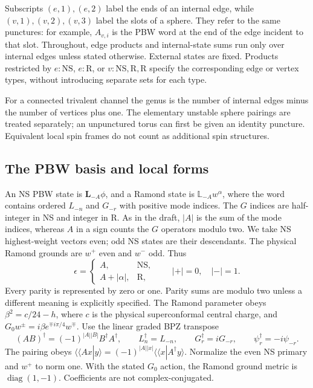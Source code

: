 \documentclass[11pt]{article}
\newcommand{\NS}{\mathrm{NS}}
\newcommand{\R}{\mathrm R}
\numberwithin{equation}{section}
\begin{document}
Subscripts $(e,1),(e,2)$ label the ends of an internal edge, while
$(v,1),(v,2),(v,3)$ label the slots of a sphere. They refer to the same
punctures: for example, $A_{v,i}$ is the PBW word at the end of the edge
incident to that slot. Throughout, edge products and internal-state sums
run only over internal edges unless stated otherwise. External states are
fixed. Products restricted by $e:\NS$, $e:\R$, or
$v:\NS,\R,\R$ specify the corresponding edge or vertex types, without
introducing separate sets for each type.

For a connected trivalent channel the genus is the number of internal
edges minus the number of vertices plus one. The elementary unstable
sphere pairings are treated separately; an unpunctured torus can first
be given an identity puncture. Equivalent local spin frames do not count
as additional spin structures.

\subsection{The PBW basis and local forms}

An NS PBW state is $\mathbf L_{-A}\phi$, and a Ramond state is
$\mathbb L_{-A}w^\alpha$, where the word contains ordered $L_{-n}$ and
$G_{-r}$ with positive mode indices. The $G$ indices are half-integer in
NS and integer in R. As in the draft, $|A|$ is the sum of the mode indices,
whereas $A$ in a sign counts the $G$ operators modulo two. We take NS
highest-weight vectors even; odd NS states are their descendants. The
physical Ramond grounds are $w^+$ even and $w^-$ odd. Thus
\begin{equation}
 \epsilon=\begin{cases}A,&\NS,\\A+|\alpha|,&\R,\end{cases}
 \qquad |+|=0,\quad|-|=1.
 \label{eq:physical-states}
\end{equation}
Every parity is represented by zero or one. Parity sums are modulo two
unless a different meaning is explicitly specified.
The Ramond parameter obeys $\beta^2=c/24-h$, where $c$ is the physical
superconformal central charge, and
$G_0w^\pm=i\beta e^{\mp i\pi/4}w^\mp$.
Use the linear graded BPZ transpose
\begin{equation}
 (AB)^\dagger=(-1)^{|A||B|}B^\dagger A^\dagger,\qquad
 L_n^\dagger=L_{-n},\qquad G_r^\dagger=iG_{-r},\qquad
 \psi_r^\dagger=-i\psi_{-r}.
 \label{eq:bpz}
\end{equation}
The pairing obeys
$\langle\!\langle Ax|y\rangle
=(-1)^{|A||x|}\langle\!\langle x|A^\dagger y\rangle$.
Normalize the even NS primary and $w^+$ to norm one. With the stated
$G_0$ action, the Ramond ground metric is
$\operatorname{diag}(1,-1)$. Coefficients are not complex-conjugated.
\end{document}
